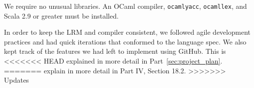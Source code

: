 We require no unusual libraries. An OCaml compiler, \verb$ocamlyacc$,
\verb$ocamllex$, and Scala 2.9 or greater must be installed.

In order to keep the LRM and compiler consistent, we followed agile development
practices and had quick iterations that conformed to the language spec. We also
kept track of the features we had left to implement using GitHub. This is
<<<<<<< HEAD
explained in more detail in Part~\ref{sec:project_plan}.
=======
explain in more detail in Part IV, Section 18.2.
>>>>>>> Updates
